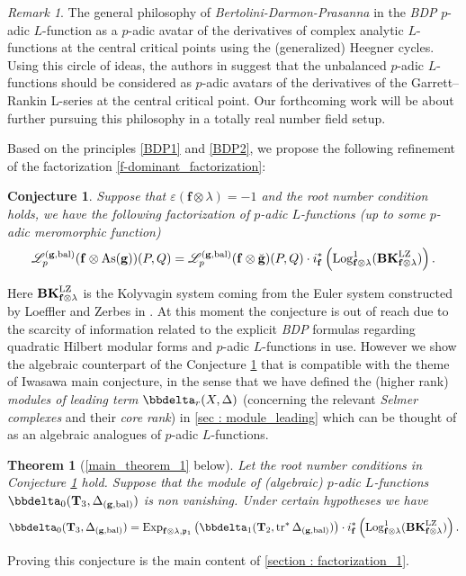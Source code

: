 \documentclass[10pt]{amsart}
\numberwithin{equation}{section}
\newtheorem{introtheorem}{Theorem} %
\newtheorem{conj}{Conjecture}
\theoremstyle{definition}
\theoremstyle{remark} %
\newtheorem{rmk}[thm]{Remark}
\newcommand{\scr}{\mathscr}
\newcommand{\As}{\operatorname{As}}
\newcommand{\Exp}{\operatorname{Exp}}
\newcommand{\Log}{\operatorname{Log}}
\renewcommand{\b}{\mathrm{bal}}
\newcommand{\f}{\mathbf{f}}
\newcommand{\g}{\mathbf{g}}
\newcommand{\p}{\mathfrak{p}}
\newcommand{\T}{\mathbf{T}}
\begin{document}
	\begin{rmk}
		\label{BDP_philosophy}
		The general philosophy of \emph{Bertolini-Darmon-Prasanna} in \cite{BDP13} the \emph{BDP} $p$-adic $L$-function as a $p$-adic avatar of the derivatives
		of complex analytic $L$-functions at the central critical points using the (generalized) Heegner cycles. Using this circle of ideas, the authors in \cite{BSV22b,DR22} suggest that the unbalanced $p$-adic $L$-functions should be considered as $p$-adic avatars of the derivatives of the Garrett–Rankin L-series at the central critical point. Our forthcoming work will be about further pursuing this philosophy in a totally real number field setup.
	\end{rmk}
	Based on the principles \ref{BDP1} and \ref{BDP2}, we propose the following refinement of the factorization \eqref{f-dominant_factorization}:
	\begin{conj}
		\label{conjecture_1}
		Suppose that $\varepsilon(\f \otimes \lambda)=-1$ and the root number condition holds, we have the following factorization of $p$-adic $L$-functions (up to some $ p $-adic meromorphic function)
		\begin{equation}
			\label{g-dominant_factorization_analytic}
			\scr{L}_p^{(\g,\b)}(\f \otimes \As(\g) )(P,Q)  = \scr{L}_p^{(\g,\b)}(\f \otimes \breve{\g} )(P,Q)\cdot i^*_\f\left(\Log_{\f \otimes \lambda}^1(\mathbf{BK}_{\f\otimes \lambda}^{\rm LZ}) \right) .
		\end{equation} 
		
	\end{conj}
	Here $ \mathbf{BK}^{\rm LZ}_{\f\otimes \lambda} $ is the Kolyvagin system coming from the Euler system constructed by Loeffler and Zerbes in \cite{loeffler2020iwasawatheoryquadratichilbert}. At this moment the conjecture is out of reach due to the scarcity of information related to the explicit \textit{BDP} formulas regarding quadratic Hilbert modular forms and $ p $-adic $ L $-functions in use. However we show the algebraic counterpart of the Conjecture \ref{conjecture_1} that is compatible with the theme of Iwasawa main conjecture, in the sense that we have defined the (higher rank) \emph{modules of leading term} $ \bbdelta_r(X,\Delta) $ (concerning the relevant \emph{Selmer complexes} and their \emph{core rank}) in \cref{sec : module_leading} which can be thought of as an algebraic analogues of $ p $-adic $ L $-functions.
	\begin{introtheorem}[\cref{main_theorem_1} below]
		\label{theoremA}
		Let the root number conditions in Conjecture \ref{conjecture_1} hold. Suppose that the module of (algebraic) $ p $-adic $ L $-functions $ \bbdelta_0(\T_{3}, \Delta_{(\g, \b)}) $ is non vanishing. Under certain hypotheses we have
		\begin{equation}
			\label{g-dominant_factorization}
			\bbdelta_0(\T_{3}, \Delta_{(\g, \b)})  =  \Exp_{\f \otimes\lambda, \p_1}\left( \bbdelta_1(\T_2, \operatorname{tr}^*\Delta_{(\g,\b)})\right)\cdot i^*_\f\left(\Log_{\f \otimes \lambda}^1(\mathbf{BK}^{\rm LZ}_{\f\otimes \lambda})\right) .
		\end{equation} 
	\end{introtheorem}
	Proving this conjecture is the main content of \cref{section : factorization_1}.
\end{document}
